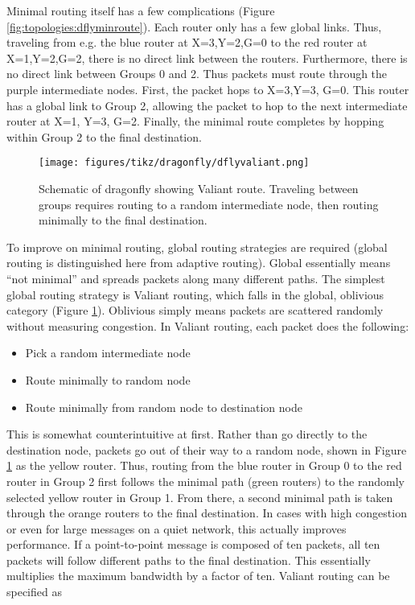 Minimal routing itself has a few complications (Figure \ref{fig:topologies:dflyminroute}).  
Each router only has a few global links.  
Thus, traveling from e.g. the blue router at X=3,Y=2,G=0 to the red router at X=1,Y=2,G=2, there is no direct link between the routers.
Furthermore, there is no direct link between Groups 0 and 2.
Thus packets must route through the purple intermediate nodes.
First, the packet hops to X=3,Y=3, G=0.  
This router has a global link to Group 2, allowing the packet to hop to the next intermediate router at X=1, Y=3, G=2.
Finally, the minimal route completes by hopping within Group 2 to the final destination.

\begin{figure}[h!]
\centering
\texttt{[image: figures/tikz/dragonfly/dflyvaliant.png]}
\caption{Schematic of dragonfly showing Valiant route. Traveling between groups requires routing to a random intermediate node, then routing minimally to the final destination.}
\label{fig:topologies:dflyvaliantroute}
\end{figure}

To improve on minimal routing, global routing strategies are required (global routing is distinguished here from adaptive routing).  
Global essentially means ``not minimal'' and spreads packets along many different paths.
The simplest global routing strategy is Valiant routing, which falls in the global, oblivious category (Figure \ref{fig:topologies:dflyvaliantroute}).
Oblivious simply means packets are scattered randomly without measuring congestion.
In Valiant routing, each packet does the following:
\begin{itemize}
\item Pick a random intermediate node 
\item Route minimally to random node
\item Route minimally from random node to destination node
\end{itemize}
This is somewhat counterintuitive at first.
Rather than go directly to the destination node, packets go out of their way to a random node, shown in Figure \ref{fig:topologies:dflyvaliantroute} as the yellow router.
Thus, routing from the blue router in Group 0 to the red router in Group 2 first follows the minimal path (green routers) to the randomly selected yellow router in Group 1. 
From there, a second minimal path is taken through the orange routers to the final destination.
In cases with high congestion or even for large messages on a quiet network, this actually improves performance.
If a point-to-point message is composed of ten packets,
all ten packets will follow different paths to the final destination.
This essentially multiplies the maximum bandwidth by a factor of ten.
Valiant routing can be specified as

